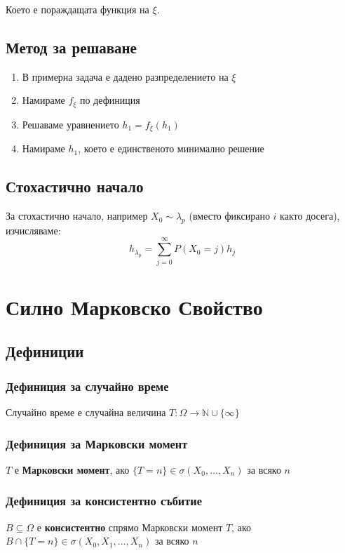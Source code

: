 \documentclass{article}
\begin{document}
Което е пораждащата функция на $\xi$.

\subsection{Метод за решаване}
\begin{enumerate}
\item В примерна задача е дадено разпределението на $\xi$
\item Намираме $f_\xi$ по дефиниция
\item Решаваме уравнението $h_1 = f_\xi(h_1)$
\item Намираме $h_1$, което е единственото минимално решение
\end{enumerate}

\subsection{Стохастично начало}
За стохастично начало, например $X_0 \sim \lambda_p$ (вместо фиксирано $i$ както досега), изчисляваме:
$$ h_{\lambda_p} = \sum_{j=0}^\infty P(X_0 = j) h_j $$

\section{Силно Марковско Свойство}
\subsection{Дефиниции}
\subsubsection*{Дефиниция за случайно време}
Случайно време е случайна величина $T: \Omega \to \mathbb{N} \cup \{\infty\}$

\subsubsection*{Дефиниция за Марковски момент}
$T$ е \textbf{Марковски момент}, ако $\{T=n\} \in \sigma(X_0,\dots,X_n)$ за всяко $n$

\subsubsection*{Дефиниция за консистентно събитие}
$B \subseteq \Omega$ е \textbf{консистентно} спрямо Марковски момент $T$, ако \\
$B \cap \{T=n\} \in \sigma(X_0,X_1,\dots,X_n)$ за всяко $n$
\end{document}
